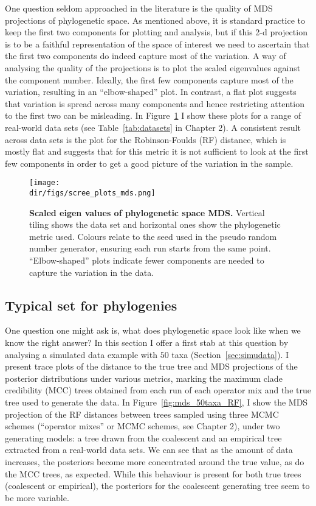 One question seldom approached in the literature is the quality of MDS projections of phylogenetic space.
As mentioned above, it is standard practice to keep the first two components for plotting and analysis, but if this 2-d  projection is to be a faithful representation of the space of interest we need to ascertain that the first two components do indeed capture most of the variation.
A way of analysing the quality of the projections is to plot the scaled eigenvalues against the component number.
Ideally, the first few components capture most of the variation, resulting in an ``elbow-shaped'' plot.
In contrast, a flat plot suggests that variation is spread across many components and hence restricting attention to the first two can be misleading.
In Figure~\ref{fig:screeplots} I show these plots for a range of real-world data sets (see Table~\ref{tab:datasets} in Chapter 2).
A consistent result across data sets is the plot for the Robinson-Foulds (RF) distance, which is mostly flat and suggests that for this metric it is not sufficient to look at the first few components in order to get a good picture of the variation in the sample.

\begin{figure}[!ht]
\begin{center}
\texttt{[image: \\dir/figs/scree\_plots\_mds.png]} 
\end{center}
 \caption[Scaled eigen values of phylogenetic space MDS.]{\textbf{Scaled eigen values of phylogenetic space MDS.}
 Vertical tiling shows the data set and horizontal ones show the phylogenetic metric used.
 Colours relate to the seed used in the pseudo random number generator, ensuring each run starts from the same point. 
 ``Elbow-shaped'' plots indicate fewer components are needed to capture the variation in the data.
 }
 \label{fig:screeplots}
\end{figure}

\subsection{Typical set for phylogenies}
\label{sec:typical}

One question one might ask is, what does phylogenetic space look like when we know the right answer?
In this section I offer a first stab at this question by analysing a simulated data example with $50$ taxa (Section~\ref{sec:simudata}).
I present trace plots of the distance to the true tree and MDS projections of the posterior distributions under various metrics, marking the maximum clade credibility (MCC) trees obtained from each run of each operator mix and the true tree used to generate the data.
In Figure~\ref{fig:mds_50taxa_RF}, I show the MDS projection of the RF distances between trees sampled using three MCMC schemes (``operator mixes'' or MCMC schemes, see Chapter 2), under two generating models: a tree drawn from the coalescent and an empirical tree extracted from a real-world data sets.
We can see that as the amount of data increases, the posteriors become more concentrated around the true value, as do the MCC trees, as expected.
While this behaviour is present for both true trees (coalescent or empirical), the posteriors for the coalescent generating tree seem to be more variable.

